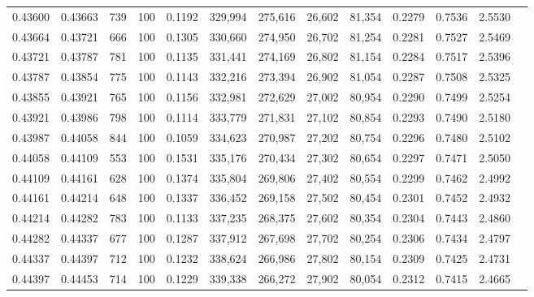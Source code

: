 \begin{tabular}{rrrrrrrrrrrrr}
0.43600 & 0.43663 &   739 & 100 &                                     0.1192 & 329,994 & 275,616 &  26,602 &  81,354 & 0.2279 & 0.7536 & 2.5530 \\
0.43664 & 0.43721 &   666 & 100 &                                     0.1305 & 330,660 & 274,950 &  26,702 &  81,254 & 0.2281 & 0.7527 & 2.5469 \\
0.43721 & 0.43787 &   781 & 100 &                                     0.1135 & 331,441 & 274,169 &  26,802 &  81,154 & 0.2284 & 0.7517 & 2.5396 \\
0.43787 & 0.43854 &   775 & 100 &                                     0.1143 & 332,216 & 273,394 &  26,902 &  81,054 & 0.2287 & 0.7508 & 2.5325 \\
0.43855 & 0.43921 &   765 & 100 &                                     0.1156 & 332,981 & 272,629 &  27,002 &  80,954 & 0.2290 & 0.7499 & 2.5254 \\
0.43921 & 0.43986 &   798 & 100 &                                     0.1114 & 333,779 & 271,831 &  27,102 &  80,854 & 0.2293 & 0.7490 & 2.5180 \\
0.43987 & 0.44058 &   844 & 100 &                                     0.1059 & 334,623 & 270,987 &  27,202 &  80,754 & 0.2296 & 0.7480 & 2.5102 \\
0.44058 & 0.44109 &   553 & 100 &                                     0.1531 & 335,176 & 270,434 &  27,302 &  80,654 & 0.2297 & 0.7471 & 2.5050 \\
0.44109 & 0.44161 &   628 & 100 &                                     0.1374 & 335,804 & 269,806 &  27,402 &  80,554 & 0.2299 & 0.7462 & 2.4992 \\
0.44161 & 0.44214 &   648 & 100 &                                     0.1337 & 336,452 & 269,158 &  27,502 &  80,454 & 0.2301 & 0.7452 & 2.4932 \\
0.44214 & 0.44282 &   783 & 100 &                                     0.1133 & 337,235 & 268,375 &  27,602 &  80,354 & 0.2304 & 0.7443 & 2.4860 \\
0.44282 & 0.44337 &   677 & 100 &                                     0.1287 & 337,912 & 267,698 &  27,702 &  80,254 & 0.2306 & 0.7434 & 2.4797 \\
0.44337 & 0.44397 &   712 & 100 &                                     0.1232 & 338,624 & 266,986 &  27,802 &  80,154 & 0.2309 & 0.7425 & 2.4731 \\
0.44397 & 0.44453 &   714 & 100 &                                     0.1229 & 339,338 & 266,272 &  27,902 &  80,054 & 0.2312 & 0.7415 & 2.4665 \\

\end{tabular}
